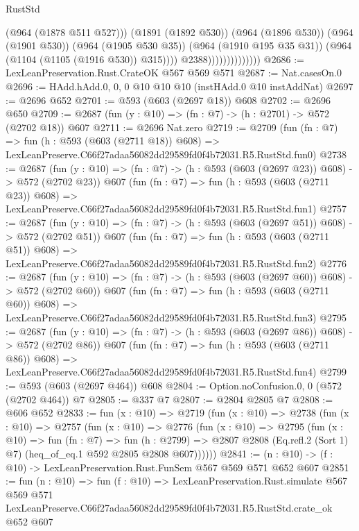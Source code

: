\begin{lexlean}{RustStd}
\begin{coremodule}
                                      (@964 (@1878 @511 @527)))
                                    (@1891 (@1892 @530))
                                    (@964 (@1896 @530))
                                    (@964 (@1901 @530))
                                    (@964 (@1905 @530 @35))
                                    (@964 (@1910 @195 @35 @31))
                                    (@964 (@1104 (@1105 (@1916 @530)) @315))))
                                @2388))))))))))))))
@2686 := LexLeanPreservation.Rust.CrateOK @567 @569 @571
@2687 := Nat.casesOn.{0}
@2696 := HAdd.hAdd.{0, 0, 0} @10 @10 @10 (instHAdd.{0} @10 instAddNat)
@2697 := @2696 @652
@2701 := @593 (@603 (@2697 @18)) @608
@2702 := @2696 @650
@2709 := @2687 (fun (y : @10) => (fn : @7) -> (h : @2701) -> @572 (@2702 @18)) @607
@2711 := @2696 Nat.zero
@2719 := @2709
    (fun (fn : @7) =>
    fun (h : @593 (@603 (@2711 @18)) @608) =>
    LexLeanPreserve.C66f27adaa56082dd29589fd0f4b72031.R5.RustStd.fun0)
@2738 := @2687
    (fun (y : @10) => (fn : @7) -> (h : @593 (@603 (@2697 @23)) @608) -> @572 (@2702 @23))
    @607
    (fun (fn : @7) =>
    fun (h : @593 (@603 (@2711 @23)) @608) =>
    LexLeanPreserve.C66f27adaa56082dd29589fd0f4b72031.R5.RustStd.fun1)
@2757 := @2687
    (fun (y : @10) => (fn : @7) -> (h : @593 (@603 (@2697 @51)) @608) -> @572 (@2702 @51))
    @607
    (fun (fn : @7) =>
    fun (h : @593 (@603 (@2711 @51)) @608) =>
    LexLeanPreserve.C66f27adaa56082dd29589fd0f4b72031.R5.RustStd.fun2)
@2776 := @2687
    (fun (y : @10) => (fn : @7) -> (h : @593 (@603 (@2697 @60)) @608) -> @572 (@2702 @60))
    @607
    (fun (fn : @7) =>
    fun (h : @593 (@603 (@2711 @60)) @608) =>
    LexLeanPreserve.C66f27adaa56082dd29589fd0f4b72031.R5.RustStd.fun3)
@2795 := @2687
    (fun (y : @10) => (fn : @7) -> (h : @593 (@603 (@2697 @86)) @608) -> @572 (@2702 @86))
    @607
    (fun (fn : @7) =>
    fun (h : @593 (@603 (@2711 @86)) @608) =>
    LexLeanPreserve.C66f27adaa56082dd29589fd0f4b72031.R5.RustStd.fun4)
@2799 := @593 (@603 (@2697 @464)) @608
@2804 := Option.noConfusion.{0, 0} (@572 (@2702 @464)) @7
@2805 := @337 @7
@2807 := @2804 @2805 @7
@2808 := @606 @652
@2833 := fun (x : @10) =>
  @2719
    (fun (x : @10) =>
    @2738
      (fun (x : @10) =>
      @2757
        (fun (x : @10) =>
        @2776
          (fun (x : @10) =>
          @2795
            (fun (x : @10) =>
            fun (fn : @7) =>
            fun (h : @2799) =>
            @2807 @2808 (Eq.refl.{2} (Sort 1) @7) (heq_of_eq.{1} @592 @2805 @2808 @607))))))
@2841 := (n : @10) -> (f : @10) -> LexLeanPreservation.Rust.FunSem @567 @569 @571 @652 @607
@2851 := fun (n : @10) =>
  fun (f : @10) =>
  LexLeanPreservation.Rust.simulate
    @567
    @569
    @571
    LexLeanPreserve.C66f27adaa56082dd29589fd0f4b72031.R5.RustStd.crate_ok
    @652
    @607
\end{coremodule}
\end{lexlean}
